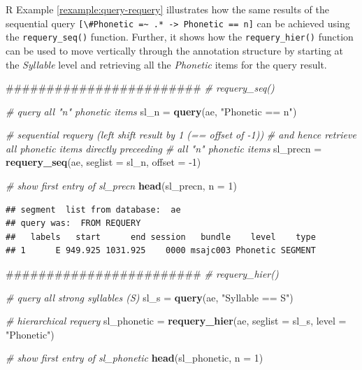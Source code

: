 \documentclass[]{book}
\newenvironment{Shaded}{\begin{snugshade}}{\end{snugshade}}
\newcommand{\CommentTok}[1]{\textcolor[rgb]{0.56,0.35,0.01}{\textit{#1}}}
\newcommand{\DataTypeTok}[1]{\textcolor[rgb]{0.13,0.29,0.53}{#1}}
\newcommand{\DecValTok}[1]{\textcolor[rgb]{0.00,0.00,0.81}{#1}}
\newcommand{\KeywordTok}[1]{\textcolor[rgb]{0.13,0.29,0.53}{\textbf{#1}}}
\newcommand{\NormalTok}[1]{#1}
\newcommand{\StringTok}[1]{\textcolor[rgb]{0.31,0.60,0.02}{#1}}
\theoremstyle{definition}
\theoremstyle{definition}
\theoremstyle{definition}
\theoremstyle{remark}
\begin{document}
R Example \ref{rexample:query-requery} illustrates how the same results
of the sequential query
\texttt{{[}\textbackslash{}\#Phonetic\ =\textasciitilde{}\ .*\ -\textgreater{}\ Phonetic\ ==\ n{]}}
can be achieved using the \texttt{requery\_seq()} function. Further, it
shows how the \texttt{requery\_hier()} function can be used to move
vertically through the annotation structure by starting at the
\emph{Syllable} level and retrieving all the \emph{Phonetic} items for
the query result.

\begin{Shaded}
\begin{Highlighting}[]
\NormalTok{########################}
\CommentTok{# requery_seq()}

\CommentTok{# query all "n" phonetic items}
\NormalTok{sl_n =}\StringTok{ }\KeywordTok{query}\NormalTok{(ae, }\StringTok{"Phonetic == n"}\NormalTok{)}

\CommentTok{# sequential requery (left shift result by 1 (== offset of -1))}
\CommentTok{# and hence retrieve all phonetic items directly preceeding}
\CommentTok{# all "n" phonetic items}
\NormalTok{sl_precn =}\StringTok{ }\KeywordTok{requery_seq}\NormalTok{(ae, }\DataTypeTok{seglist =}\NormalTok{ sl_n, }\DataTypeTok{offset =} \DecValTok{-1}\NormalTok{)}

\CommentTok{# show first entry of sl_precn}
\KeywordTok{head}\NormalTok{(sl_precn, }\DataTypeTok{n =} \DecValTok{1}\NormalTok{)}
\end{Highlighting}
\end{Shaded}

\begin{verbatim}
## segment  list from database:  ae 
## query was:  FROM REQUERY 
##   labels   start      end session   bundle    level    type
## 1      E 949.925 1031.925    0000 msajc003 Phonetic SEGMENT
\end{verbatim}

\begin{Shaded}
\begin{Highlighting}[]
\NormalTok{########################}
\CommentTok{# requery_hier()}

\CommentTok{# query all strong syllables (S)}
\NormalTok{sl_s =}\StringTok{ }\KeywordTok{query}\NormalTok{(ae, }\StringTok{"Syllable == S"}\NormalTok{)}

\CommentTok{# hierarchical requery}
\NormalTok{sl_phonetic =}\StringTok{ }\KeywordTok{requery_hier}\NormalTok{(ae, }\DataTypeTok{seglist =}\NormalTok{ sl_s,}
                           \DataTypeTok{level =} \StringTok{"Phonetic"}\NormalTok{)}

\CommentTok{# show first entry of sl_phonetic}
\KeywordTok{head}\NormalTok{(sl_phonetic, }\DataTypeTok{n =} \DecValTok{1}\NormalTok{)}
\end{Highlighting}
\end{Shaded}
\end{document}
